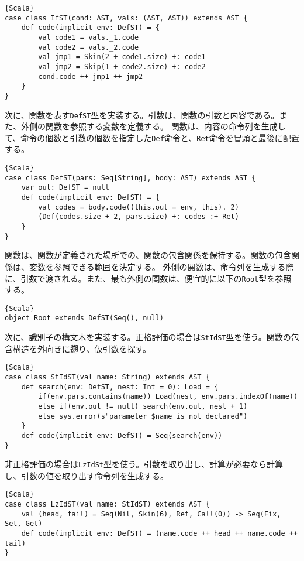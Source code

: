 \documentclass[10pt,a4paper]{book}
\begin{document}
\begin{Verbatim}{Scala}
case class IfST(cond: AST, vals: (AST, AST)) extends AST {
	def code(implicit env: DefST) = {
		val code1 = vals._1.code
		val code2 = vals._2.code
		val jmp1 = Skin(2 + code1.size) +: code1
		val jmp2 = Skip(1 + code2.size) +: code2
		cond.code ++ jmp1 ++ jmp2
	}
}
\end{Verbatim}

次に、関数を表す\texttt{DefST}型を実装する。引数は、関数の引数と内容である。また、外側の関数を参照する変数を定義する。
関数は、内容の命令列を生成して、命令の個数と引数の個数を指定した\texttt{Def}命令と、\texttt{Ret}命令を冒頭と最後に配置する。

\begin{Verbatim}{Scala}
case class DefST(pars: Seq[String], body: AST) extends AST {
	var out: DefST = null
	def code(implicit env: DefST) = {
		val codes = body.code((this.out = env, this)._2)
		(Def(codes.size + 2, pars.size) +: codes :+ Ret)
	}
}
\end{Verbatim}

関数は、関数が定義された場所での、関数の包含関係を保持する。関数の包含関係は、変数を参照できる範囲を決定する。
外側の関数は、命令列を生成する際に、引数で渡される。また、最も外側の関数は、便宜的に以下の\texttt{Root}型を参照する。

\begin{Verbatim}{Scala}
object Root extends DefST(Seq(), null)
\end{Verbatim}

次に、識別子の構文木を実装する。正格評価の場合は\texttt{StIdST}型を使う。関数の包含構造を外向きに遡り、仮引数を探す。

\begin{Verbatim}{Scala}
case class StIdST(val name: String) extends AST {
	def search(env: DefST, nest: Int = 0): Load = {
		if(env.pars.contains(name)) Load(nest, env.pars.indexOf(name))
		else if(env.out != null) search(env.out, nest + 1)
		else sys.error(s"parameter $name is not declared")
	}
	def code(implicit env: DefST) = Seq(search(env))
}
\end{Verbatim}

非正格評価の場合は\texttt{LzIdSt}型を使う。引数を取り出し、計算が必要なら計算し、引数の値を取り出す命令列を生成する。

\begin{Verbatim}{Scala}
case class LzIdST(val name: StIdST) extends AST {
	val (head, tail) = Seq(Nil, Skin(6), Ref, Call(0)) -> Seq(Fix, Set, Get)
	def code(implicit env: DefST) = (name.code ++ head ++ name.code ++ tail)
}
\end{Verbatim}
\end{document}
